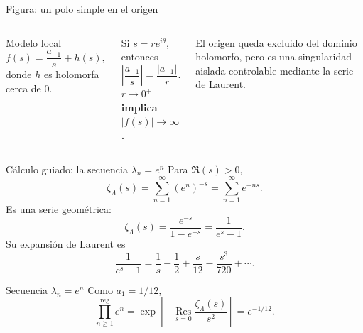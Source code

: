 \documentclass[aspectratio=169,11pt]{beamer}
\newcommand{\reg}{\operatorname{reg}}
\newcommand{\Res}{\operatorname*{Res}}
\newcommand{\highlight}[1]{\textcolor{UdeAGreen}{\bfseries #1}}
\begin{document}
\begin{frame}[t]{Figura: un polo simple en el origen}
  \small
  \begin{columns}[c,onlytextwidth]
      \centering
      \begin{block}{Modelo local}
        \[
          f(s)=\frac{a_{-1}}{s}+h(s),
        \]
        donde $h$ es holomorfa cerca de $0$.
      \end{block}
      \pause
      Si $s=re^{i\theta}$, entonces
      \[
        \left|\frac{a_{-1}}{s}\right|
          =\frac{|a_{-1}|}{r}.
      \]
      \pause
      \highlight{$r\to0^+$ implica $|f(s)|\to\infty$.}

      \medskip
      El origen queda excluido del dominio holomorfo, pero es una singularidad aislada
      controlable mediante la serie de Laurent.
  \end{columns}
\end{frame}

\begin{frame}[t]{Cálculo guiado: la secuencia $\lambda_n=e^n$}
  \small
  Para $\Re(s)>0$,
  \[
    \zeta_\Lambda(s)=\sum_{n=1}^{\infty}(e^n)^{-s}
      =\sum_{n=1}^{\infty}e^{-ns}.
  \]
  \pause
  Es una serie geométrica:
  \[
    \zeta_\Lambda(s)=\frac{e^{-s}}{1-e^{-s}}=\frac{1}{e^s-1}.
  \]
  \pause
  Su expansión de Laurent es
  \[
    \frac{1}{e^s-1}=\frac1s-\frac12+\frac{s}{12}-\frac{s^3}{720}+\cdots.
  \]
  \pause
  \begin{exampleblock}{Secuencia $\lambda_n=e^n$}
    Como $a_1=1/12$,
    \[
      \prod_{n\ge1}^{\reg}e^n
      =\exp\!\left[-\Res_{s=0}\frac{\zeta_\Lambda(s)}{s^2}\right]
      =e^{-1/12}.
    \]
  \end{exampleblock}
\end{frame}
\end{document}
